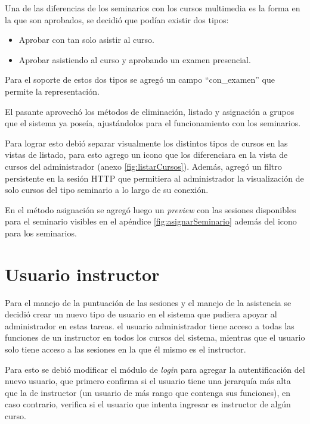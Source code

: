	Una de las diferencias de los seminarios con los cursos multimedia es la forma en la que son aprobados, se decidió que podían existir dos tipos:

	\begin{itemize}
		\item Aprobar con tan solo asistir al curso.
		\item Aprobar asistiendo al curso y aprobando un examen presencial.
	\end{itemize}

	Para el soporte de estos dos tipos se agregó un campo ``con\_examen'' que permite la representación.

	El pasante aprovechó los métodos de eliminación, listado y asignación a grupos que el sistema ya poseía, ajustándolos para el funcionamiento con los seminarios. 

	Para lograr esto debió separar visualmente los distintos tipos de cursos en las vistas de listado, para esto agrego un icono que los diferenciara en la vista de cursos del administrador (anexo \ref{fig:listarCursos}). Además, agregó un filtro persistente en la sesión \gls{HTTP} que permitiera al administrador la visualización de solo cursos del tipo seminario a lo largo de su conexión.

	En el método asignación se agregó luego un \emph{preview} con las sesiones disponibles para el seminario visibles en el apéndice \ref{fig:asignarSeminario} además del icono para los seminarios. 


	\section{Usuario instructor} %
	\label{sec:usuario_instructor}
	
	Para el manejo de la puntuación de las sesiones y el manejo de la asistencia se decidió crear un nuevo tipo de usuario en el sistema que pudiera apoyar al administrador en estas tareas. el usuario administrador tiene acceso a todas las funciones de un instructor en todos los cursos del sistema, mientras que el usuario solo tiene acceso a las sesiones en la que él mismo es el instructor.

	Para esto se debió modificar el módulo de \emph{login} para agregar la autentificación del nuevo usuario, que primero confirma si el usuario tiene una jerarquía más alta que la de instructor (un usuario de más rango que contenga sus funciones), en caso contrario, verifica si el usuario que intenta ingresar es instructor de algún curso.


